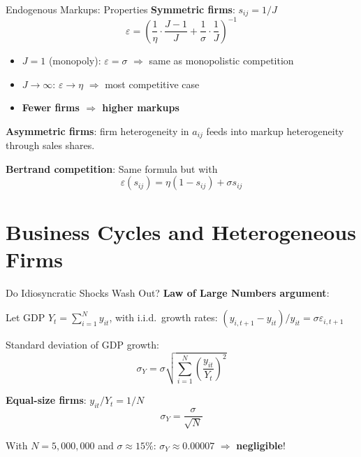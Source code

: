 \documentclass[blue]{beamer}
\begin{document}
\begin{frame}{Endogenous Markups: Properties}
	\textbf{Symmetric firms}: $s_{ij} = 1/J$
	\[
	\varepsilon = \left( \frac{1}{\eta} \cdot \frac{J-1}{J} + \frac{1}{\sigma} \cdot \frac{1}{J} \right)^{-1}
	\]
	
	\begin{itemize}
		\item $J = 1$ (monopoly): $\varepsilon = \sigma$ $\Rightarrow$ same as monopolistic competition
		\item $J \to \infty$: $\varepsilon \to \eta$ $\Rightarrow$ most competitive case
		\item \textbf{Fewer firms $\Rightarrow$ higher markups}
	\end{itemize}
	
	\bigskip
	\textbf{Asymmetric firms}: firm heterogeneity in $a_{ij}$ feeds into markup heterogeneity through sales shares.
	
	\bigskip
	\textbf{Bertrand competition}: Same formula but with
	\[
	\varepsilon(s_{ij}) = \eta(1-s_{ij}) + \sigma s_{ij}
	\]
\end{frame}

\section{Business Cycles and Heterogeneous Firms}

\begin{frame}{Do Idiosyncratic Shocks Wash Out?}
	\textbf{Law of Large Numbers argument}:
	
	Let GDP $Y_t = \sum_{i=1}^N y_{it}$, with i.i.d.\ growth rates: $(y_{i,t+1} - y_{it})/y_{it} = \sigma \varepsilon_{i,t+1}$
	
	\bigskip
	Standard deviation of GDP growth:
	\[
	\sigma_Y = \sigma \sqrt{\sum_{i=1}^N \left(\frac{y_{it}}{Y_t}\right)^2}
	\]
	
	\bigskip
	\textbf{Equal-size firms}: $y_{it}/Y_t = 1/N$
	\[
	\sigma_Y = \frac{\sigma}{\sqrt{N}}
	\]
	
	With $N = 5{,}000{,}000$ and $\sigma \approx 15\%$: $\sigma_Y \approx 0.00007$ $\Rightarrow$ \textbf{negligible}!
\end{frame}
\end{document}
